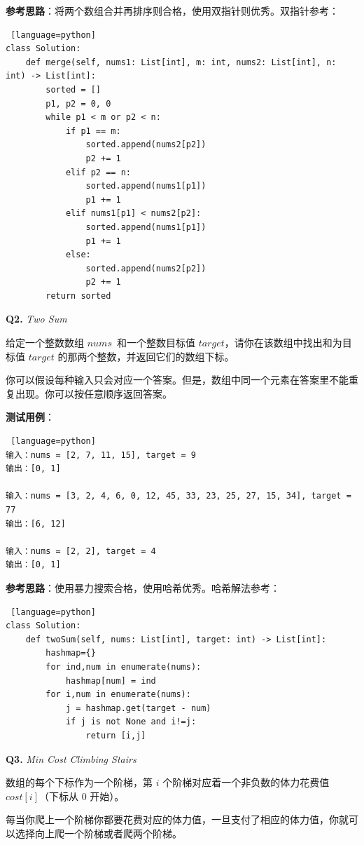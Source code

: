 \documentclass[cn,10pt,math=newtx,citestyle=gb7714-2015,bibstyle=gb7714-2015]{elegantbook}
\begin{document}
\textbf{参考思路}：将两个数组合并再排序则合格，使用双指针则优秀。双指针参考：

\begin{lstlisting} [language=python]
class Solution:
    def merge(self, nums1: List[int], m: int, nums2: List[int], n: int) -> List[int]:
        sorted = []
        p1, p2 = 0, 0
        while p1 < m or p2 < n:
            if p1 == m:
                sorted.append(nums2[p2])
                p2 += 1
            elif p2 == n:
                sorted.append(nums1[p1])
                p1 += 1
            elif nums1[p1] < nums2[p2]:
                sorted.append(nums1[p1])
                p1 += 1
            else:
                sorted.append(nums2[p2])
                p2 += 1
        return sorted
\end{lstlisting}


\textbf{Q2.} \textit{Two Sum}

给定一个整数数组 $nums$ 和一个整数目标值 $target$，请你在该数组中找出和为目标值 $target$ 的那两个整数，并返回它们的数组下标。

你可以假设每种输入只会对应一个答案。但是，数组中同一个元素在答案里不能重复出现。你可以按任意顺序返回答案。

\textbf{测试用例}：
\begin{lstlisting} [language=python]
输入：nums = [2, 7, 11, 15], target = 9
输出：[0, 1]

输入：nums = [3, 2, 4, 6, 0, 12, 45, 33, 23, 25, 27, 15, 34], target = 77
输出：[6, 12]

输入：nums = [2, 2], target = 4
输出：[0, 1]
\end{lstlisting}

\textbf{参考思路}：使用暴力搜索合格，使用哈希优秀。哈希解法参考：

\begin{lstlisting} [language=python]
class Solution:
    def twoSum(self, nums: List[int], target: int) -> List[int]:
        hashmap={}
        for ind,num in enumerate(nums):
            hashmap[num] = ind
        for i,num in enumerate(nums):
            j = hashmap.get(target - num)
            if j is not None and i!=j:
                return [i,j]
\end{lstlisting}


\textbf{Q3.} \textit{Min Cost Climbing Stairs}

数组的每个下标作为一个阶梯，第 $i$ 个阶梯对应着一个非负数的体力花费值 $cost[i]$（下标从 $0$ 开始）。

每当你爬上一个阶梯你都要花费对应的体力值，一旦支付了相应的体力值，你就可以选择向上爬一个阶梯或者爬两个阶梯。
\end{document}
